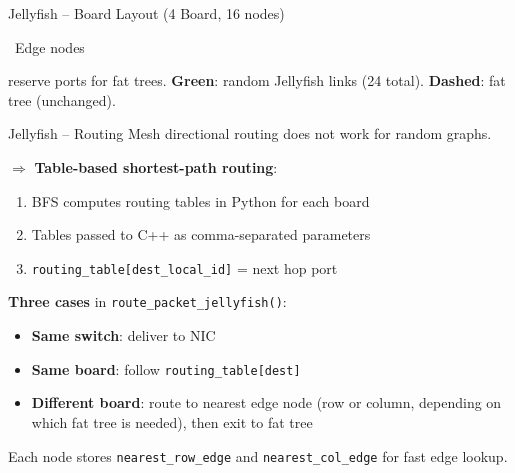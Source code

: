 \documentclass[t]{beamer}
\begin{document}
\begin{frame}{Jellyfish -- Board Layout (4 Board, 16 nodes)}
    \vspace{0.15cm}
    \footnotesize
    \colorbox{MyOrange!20}{\strut~Edge nodes~} reserve ports for fat trees.
    \textcolor{green!60!black}{\textbf{Green}}: random Jellyfish links (24 total).
    \textcolor{MyOrange}{\textbf{Dashed}}: fat tree (unchanged).
\end{frame}

\begin{frame}{Jellyfish -- Routing}
    Mesh directional routing does not work for random graphs.

    \vspace{0.2cm}

    $\Rightarrow$ \textbf{Table-based shortest-path routing}:

    \begin{enumerate}
        \item BFS computes routing tables in Python for each board
        \item Tables passed to C++ as comma-separated parameters
        \item \texttt{routing\_table[dest\_local\_id]} = next hop port
    \end{enumerate}

    \vspace{0.2cm}

    \textbf{Three cases} in \texttt{route\_packet\_jellyfish()}:
    \begin{itemize}
        \item \textbf{Same switch}: deliver to NIC
        \item \textbf{Same board}: follow \texttt{routing\_table[dest]}
        \item \textbf{Different board}: route to nearest edge node (row or column, depending on which fat tree is needed), then exit to fat tree
    \end{itemize}

    \vspace{0.2cm}

    Each node stores \texttt{nearest\_row\_edge} and \texttt{nearest\_col\_edge} for fast edge lookup.
\end{frame}
\end{document}
